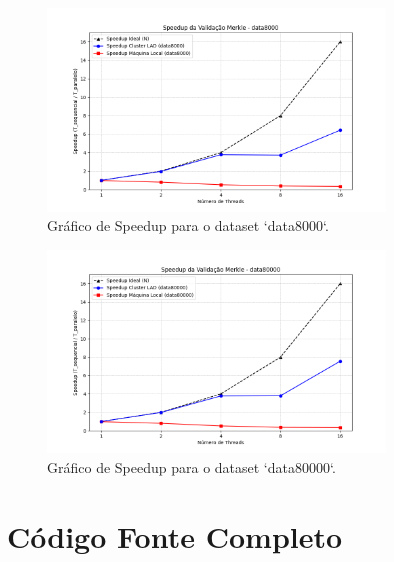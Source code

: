 \documentclass[10pt,a4paper]{article}
\begin{document}
\begin{figure}[!htbp]
    \centering
    \includegraphics[width=0.8\textwidth]{graficos/speedup_data8000.png}
    \caption{Gráfico de Speedup para o dataset `data8000`.}
    \label{fig:speedup_data8000}
\end{figure}

\begin{figure}[!htbp]
    \centering
    \includegraphics[width=0.8\textwidth]{graficos/speedup_data80000.png}
    \caption{Gráfico de Speedup para o dataset `data80000`.}
    \label{fig:speedup_data80000}
\end{figure}

\clearpage
\section{Código Fonte Completo}
\label{app:codigo}



\vspace{1em} %
\end{document}

